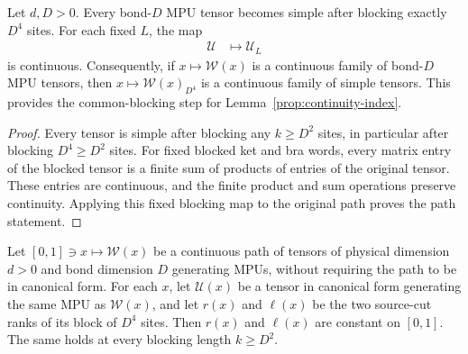 \begin{lemma}
    \label{thm:mpu_common_pow_four_simple_blocking}
    \leanok
    Let $d,D>0$.  Every bond-$D$ MPU tensor becomes simple after blocking
    exactly $D^4$ sites.  For each fixed $L$, the map
    \begin{align}
        \mathcal U & \longmapsto \mathcal U_L
    \end{align}
    is continuous.  Consequently, if $x\mapsto\mathcal W(x)$ is a continuous
    family of bond-$D$ MPU tensors, then
    $x\mapsto\mathcal W(x)_{D^4}$ is a continuous family of simple tensors.
    This provides the common-blocking step for
    Lemma~\ref{prop:continuity-index}.
\end{lemma}

\begin{proof}\leanok
    Every tensor is simple after blocking any $k\geq D^2$ sites, in
    particular after blocking $D^4\geq D^2$ sites.
    For fixed blocked ket and bra words, every matrix entry of the blocked
    tensor is a finite sum of products of entries of the original tensor.
    These entries are continuous, and the finite product and sum operations
    preserve continuity.  Applying this fixed blocking map to the original
    path proves the path statement.
\end{proof}

\begin{lemma}
    \label{prop:continuity-index}
    \leanok
    Let $[0,1]\ni x\mapsto\mathcal W(x)$ be a continuous path of tensors of
    physical dimension $d>0$ and bond dimension $D$ generating MPUs, without
    requiring the path to be in canonical form. For each $x$, let
    $\mathcal U(x)$ be a tensor in canonical form generating the same MPU as
    $\mathcal W(x)$, and let $r(x)$ and $\ell(x)$ be the two source-cut ranks
    of its block of $D^4$ sites. Then $r(x)$ and $\ell(x)$ are
    constant on $[0,1]$. The same holds at every blocking length $k\geq D^2$.
\end{lemma}

